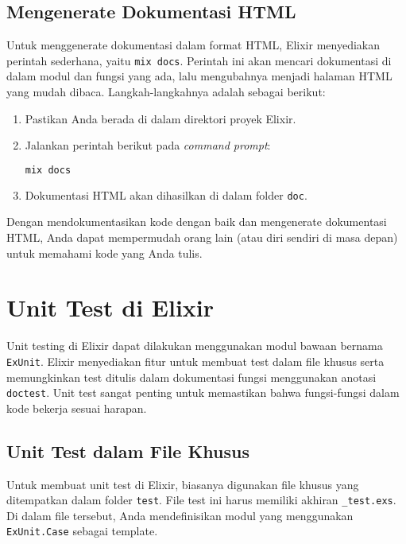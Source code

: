 \subsection{Mengenerate Dokumentasi HTML}

Untuk menggenerate dokumentasi dalam format HTML, Elixir menyediakan perintah sederhana, yaitu \texttt{mix docs}. Perintah ini akan mencari dokumentasi di dalam modul dan fungsi yang ada, lalu mengubahnya menjadi halaman HTML yang mudah dibaca. Langkah-langkahnya adalah sebagai berikut:

\begin{enumerate}
	\item Pastikan Anda berada di dalam direktori proyek Elixir.
	\item Jalankan perintah berikut pada \textit{command prompt}:
	\begin{lstlisting}[language=Bash]
mix docs
	\end{lstlisting}
	
	\item Dokumentasi HTML akan dihasilkan di dalam folder \texttt{doc}.
\end{enumerate}

Dengan mendokumentasikan kode dengan baik dan mengenerate dokumentasi HTML, Anda dapat mempermudah orang lain (atau diri sendiri di masa depan) untuk memahami kode yang Anda tulis.



\section{Unit Test di Elixir}

Unit testing di Elixir dapat dilakukan menggunakan modul bawaan bernama \texttt{ExUnit}. Elixir menyediakan fitur untuk membuat test dalam file khusus serta memungkinkan test ditulis dalam dokumentasi fungsi menggunakan anotasi \texttt{doctest}. Unit test sangat penting untuk memastikan bahwa fungsi-fungsi dalam kode bekerja sesuai harapan.

\subsection{Unit Test dalam File Khusus}

Untuk membuat unit test di Elixir, biasanya digunakan file khusus yang ditempatkan dalam folder \texttt{test}. File test ini harus memiliki akhiran \texttt{\_test.exs}. Di dalam file tersebut, Anda mendefinisikan modul yang menggunakan \texttt{ExUnit.Case} sebagai template.

